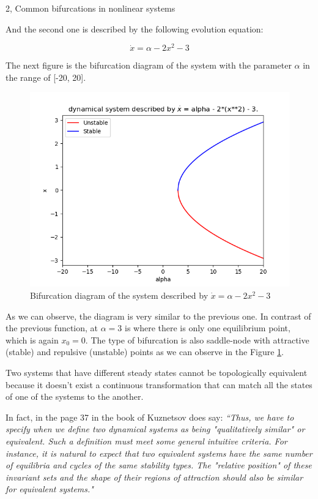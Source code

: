 \documentclass[10pt,a4paper]{article}
\begin{document}
\begin{task}{2, Common bifurcations in nonlinear systems}
\newpage

\noindent And the second one is described by the following evolution equation:

\begin{equation}\label{X2}
    \dot{x} = {\alpha} - 2x^2 - 3
\end{equation}

The next figure is the bifurcation diagram of the system with the parameter ${\alpha}$ in the range of [-20, 20].  

\begin{figure} [H]
    \centering
    \includegraphics[width=15cm]{images/function2_task_2.png}
    \caption{Bifurcation diagram of the system described by $\dot{x} = {\alpha} - 2x^2 - 3$}
    \label{function2}
\end{figure}

As we can observe, the diagram is very similar to the previous one. In contrast of the previous function, at $\alpha = 3$ is where there is only one equilibrium point, which is again ${x_0} = 0$. The type of bifurcation is also saddle-node with attractive (stable) and repulsive (unstable) points as we can observe in the Figure \ref{function2}.

Two systems that have different steady states cannot be topologically equivalent because it doesn't exist a continuous transformation that can match all the states of one of the systems to the another. 

In fact, in the page 37 in the book of Kuznetsov \cite{Yuri} does say: \emph{``Thus, we have to specify when we define two dynamical systems as being "qualitatively similar" or equivalent. Such a definition must meet some general intuitive criteria. For instance, it is natural to expect that two equivalent systems have the same number of equilibria and cycles of the same stability types. The "relative position" of these invariant sets and the shape of their regions of attraction should also be similar for equivalent systems."}


\end{task}
\end{document}
